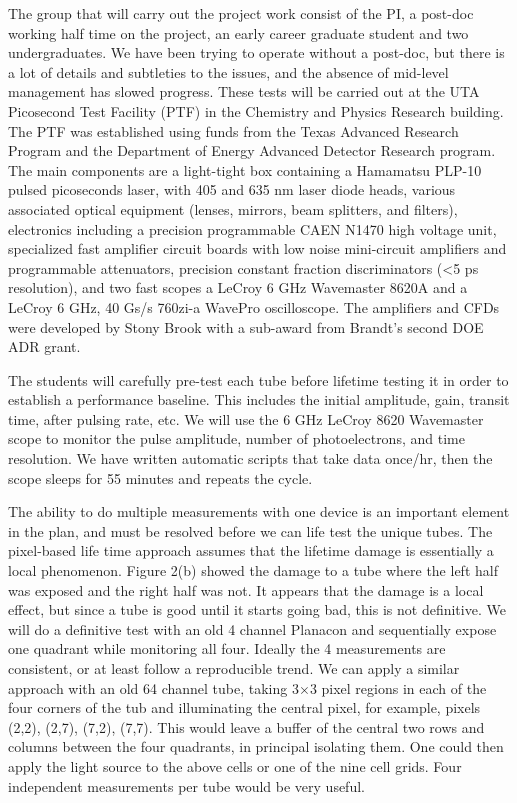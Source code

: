 
The group that will carry out the project work consist of the PI, a post-doc working half time on the project, an early career graduate student and two undergraduates. We have been trying to operate without a post-doc, but there is a lot of details and subtleties to the issues, and the absence of mid-level management has slowed progress.  These tests will be carried out at the UTA Picosecond Test Facility (PTF) in the Chemistry and Physics Research building.  The PTF was established using funds from the Texas Advanced Research Program and the Department of Energy Advanced Detector Research program.  The main components are a light-tight box containing a Hamamatsu PLP-10 pulsed picoseconds laser, with 405 and 635 nm laser diode heads, various associated optical equipment (lenses, mirrors, beam splitters, and filters), electronics including a precision programmable CAEN N1470 high voltage unit, specialized fast amplifier circuit boards with low noise mini-circuit amplifiers and programmable attenuators, precision constant fraction discriminators (<5 ps resolution),  and two fast scopes a LeCroy 6 GHz Wavemaster 8620A and a LeCroy 6 GHz, 40 Gs/s 760zi-a WavePro oscilloscope.   The amplifiers and CFDs were developed by Stony Brook with a sub-award from Brandt’s second DOE ADR grant. 

The students will carefully pre-test each tube before lifetime testing it in order to establish a performance baseline. This includes the initial amplitude, gain, transit time, after pulsing rate, etc. We will use the 6 GHz LeCroy 8620 Wavemaster scope to monitor the pulse amplitude, number of photoelectrons, and time resolution. We have written automatic scripts that take data once/hr, then the scope sleeps for 55 minutes and repeats the cycle.  

The ability to do multiple measurements with one device is an important element in the plan, and must be resolved before we can life test the unique tubes. The pixel-based life time approach assumes that the lifetime damage is essentially a local phenomenon. Figure 2(b) showed the damage to a tube where the left half was exposed and the right half was not.  It appears that the damage is a local effect, but since a tube is good until it starts going bad, this is not definitive. We will do a definitive test  with an old 4 channel Planacon and sequentially expose one quadrant while monitoring all four.  Ideally the 4 measurements are consistent, or at least follow a reproducible trend. We can apply a similar approach with an old 64 channel tube, taking  3$\times$3 pixel regions in each of the four corners of the tub and illuminating the central pixel, for example,  pixels (2,2),  (2,7), (7,2), (7,7). This would leave a buffer of the central two rows and columns between the four quadrants, in principal isolating them.  One could then apply the light source to the above cells or one of the nine cell grids. Four independent measurements per tube would be very useful.   

